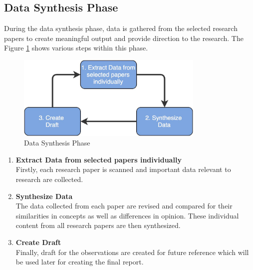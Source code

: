\subsection{Data Synthesis Phase}\label{section:context/approach/data_synthesis_phase}
During the data synthesis phase, data is gathered from the selected research papers to create meaningful output and provide direction to the research. The Figure \ref{fig:context/data_synthesis_phase} shows various steps within this phase.
\begin{figure}[H]
\begin{center}
\includegraphics[width=0.8\textwidth]{figures/introduction_data_synthesis_phase}
\caption{Data Synthesis Phase}
\label{fig:context/data_synthesis_phase}
\end{center}
\end{figure}

\begin{enumerate}
\item \textbf{Extract Data from selected papers individually}\\
Firstly, each research paper is scanned and important data relevant to research are collected.
\item \textbf{Synthesize Data}\\
The data collected from each paper are revised and compared for their similarities in concepts as well as differences in opinion. These individual content from all research papers are then synthesized.
\item \textbf{Create Draft}\\
Finally, draft for the observations are created for future reference which will be used later for creating the final report.
\end{enumerate}


